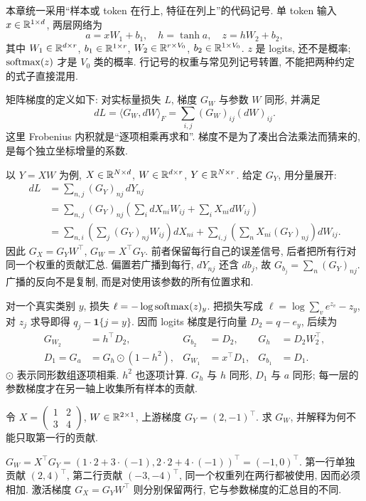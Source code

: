 本章统一采用“样本或 token 在行上, 特征在列上”的代码记号. 单 token 输入 $x\in\mathbb R^{1\times d}$, 两层网络为
\[
a=xW_1+b_1,\quad h=\tanh a,\quad z=hW_2+b_2,
\]
其中 $W_1\in\mathbb R^{d\times r}$, $b_1\in\mathbb R^{1\times r}$, $W_2\in\mathbb R^{r\times V_0}$, $b_2\in\mathbb R^{1\times V_0}$. $z$ 是 logits, 还不是概率; $\operatorname{softmax}(z)$ 才是 $V_0$ 类的概率. 行记号的权重与常见列记号转置, 不能把两种约定的式子直接混用.

矩阵梯度的定义如下: 对实标量损失 $L$, 梯度 $G_W$ 与参数 $W$ 同形, 并满足
\[dL=\langle G_W,dW\rangle_F=\sum_{i,j}(G_W)_{ij}(dW)_{ij}.\] 这里 Frobenius 内积就是“逐项相乘再求和”. 梯度不是为了凑出合法乘法而猜来的, 是每个独立坐标增量的系数.

以 $Y=XW$ 为例, $X\in\mathbb R^{N\times d}$, $W\in\mathbb R^{d\times r}$, $Y\in\mathbb R^{N\times r}$. 给定 $G_Y$, 用分量展开:
\begin{align*}
dL&=\sum_{n,j}(G_Y)_{nj}\,dY_{nj}\\
&=\sum_{n,j}(G_Y)_{nj}\left(\sum_i dX_{ni}W_{ij}+\sum_iX_{ni}dW_{ij}\right)\\
&=\sum_{n,i}\left(\sum_j(G_Y)_{nj}W_{ij}\right)dX_{ni}
+\sum_{i,j}\left(\sum_nX_{ni}(G_Y)_{nj}\right)dW_{ij}.
\end{align*}
因此 $G_X=G_YW^\top$, $G_W=X^\top G_Y$. 前者保留每行自己的误差信号, 后者把所有行对同一个权重的贡献汇总. 偏置若广播到每行, $dY_{nj}$ 还含 $db_j$, 故 $G_{b_j}=\sum_n(G_Y)_{nj}$. 广播的反向不是复制, 而是对使用该参数的所有位置求和.

对一个真实类别 $y$, 损失 $\ell=-\log\operatorname{softmax}(z)_y$. 把损失写成 $\ell=\log\sum_v e^{z_v}-z_y$, 对 $z_j$ 求导即得 $q_j-\mathbf1\{j=y\}$. 因而 logits 梯度是行向量 $D_2=q-e_y$, 后续为
\begin{align*}
G_{W_2}&=h^\top D_2,&G_{b_2}&=D_2,&G_h&=D_2W_2^\top,\\
D_1=G_a&=G_h\odot(1-h^2),&G_{W_1}&=x^\top D_1,&G_{b_1}&=D_1.
\end{align*}
$\odot$ 表示同形数组逐项相乘. $h^2$ 也逐项计算. $G_h$ 与 $h$ 同形, $D_1$ 与 $a$ 同形; 每一层的参数梯度才在另一轴上收集所有样本的贡献.

\begin{exercise}
令 $X=\left(\begin{smallmatrix}1&2\\3&4\end{smallmatrix}\right)$, $W\in\mathbb R^{2\times1}$, 上游梯度 $G_Y=(2,-1)^\top$. 求 $G_W$, 并解释为何不能只取第一行的贡献.
\end{exercise}
\begin{solution}
$G_W=X^\top G_Y=(1\cdot2+3\cdot(-1),2\cdot2+4\cdot(-1))^\top=(-1,0)^\top$. 第一行单独贡献 $(2,4)^\top$, 第二行贡献 $(-3,-4)^\top$, 同一个权重列在两行都被使用, 因而必须相加. 激活梯度 $G_X=G_YW^\top$ 则分别保留两行, 它与参数梯度的汇总目的不同.
\end{solution}

